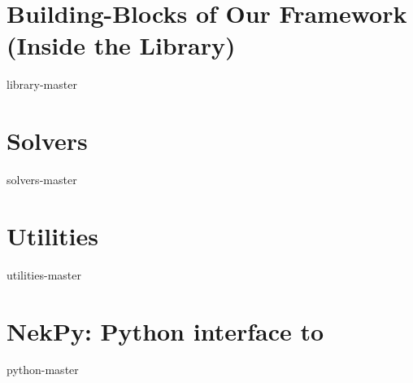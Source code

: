 \part{Building-Blocks of Our Framework (Inside the Library)} \label{part:library}


{library-master}
\part{Solvers} \label{part:solvers}

{solvers-master}

\part{Utilities} \label{part:utilities}

{utilities-master}

\part{NekPy: Python interface to \nek{}} \label{part:nekpy}

{python-master}



 

\printindex


